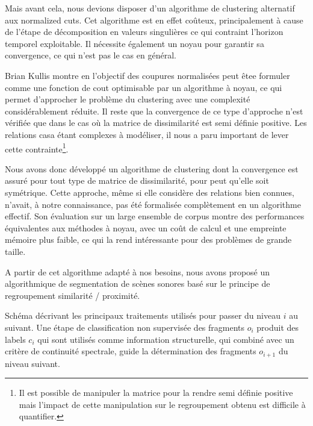 Mais avant cela, nous devions disposer d'un algorithme de clustering alternatif aux normalized cuts. Cet algorithme est en effet coûteux, principalement à cause de l'étape de décomposition en valeurs singulières ce qui contraint l'horizon temporel exploitable. Il nécessite également un noyau pour garantir sa convergence, ce qui n'est pas le cas en général.

Brian Kullis montre en  l'objectif des coupures normalisées peut êtee formuler comme une fonction de cout optimisable par un algorithme à noyau, ce qui permet d'approcher le problème du clustering avec une complexité considérablement réduite. Il reste que la convergence de ce type d'approche n'est vérifiée que dans le cas où la matrice de dissimilarité est semi définie positive. Les relations casa étant complexes à modéliser, il nous a paru important de lever cette contrainte\footnote{Il est possible de manipuler la matrice pour la rendre semi définie positive \cite{optimal2003} mais l'impact de cette manipulation sur le regroupement obtenu est difficile à quantifier.}.

Nous avons donc développé un algorithme de clustering dont la convergence est assuré pour tout type de matrice de dissimilarité, pour peut qu'elle soit symétrique. Cette approche, même si elle considère des relations bien connues, n'avait, à notre connaissance, pas été formalisée complètement en un algorithme effectif. Son évaluation sur un large ensemble de corpus \cite{keogh} montre des performances équivalentes aux méthodes à noyau, avec un coût de calcul et une empreinte mémoire plus faible, ce qui la rend intéressante pour des problèmes de grande taille\cite{rossignolKaverages}.

A partir de cet algorithme adapté à nos besoins, nous avons proposé un algorithmique de segmentation de scènes sonores basé sur le principe de regroupement similarité / proximité\cite{rossignolhal-01122006}.


Schéma décrivant les principaux traitements utilisés pour passer du niveau $i$ au suivant. Une étape de classification non supervisée des fragments $o_i$ produit des labels $c_i$ qui sont utilisés comme information structurelle, qui combiné avec un critère de continuité spectrale, guide la détermination des fragments $o_{i+1}$ du niveau suivant.

